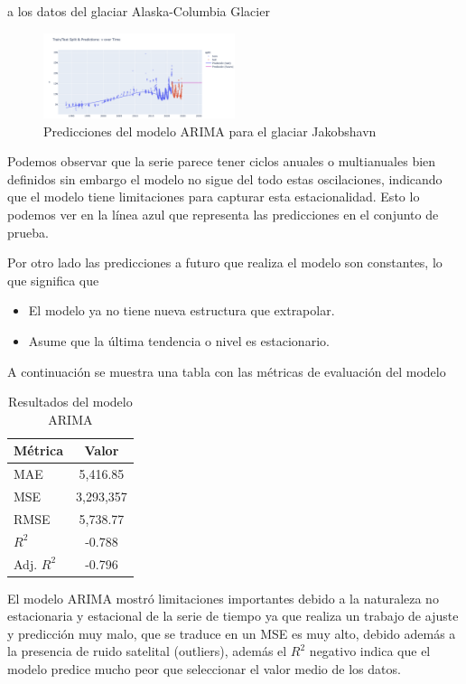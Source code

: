 \documentclass[sigconf,language=spanish]{acmart}
\begin{document}
a los datos del glaciar Alaska-Columbia Glacier

\begin{figure}[H]
    \centering
    \includegraphics[width=0.5\textwidth]{ARIMA1.png} %
    \caption{Predicciones del modelo ARIMA para el glaciar Jakobshavn}
    \label{fig:ARIMA1}
\end{figure}

Podemos observar que la serie parece tener ciclos anuales o multianuales bien definidos sin embargo el modelo
no sigue del todo estas oscilaciones, indicando que el modelo tiene limitaciones para capturar esta estacionalidad. 
Esto lo podemos ver en la línea azul que representa las predicciones en el conjunto de prueba.

Por otro lado las predicciones a futuro que realiza el modelo son constantes, lo que significa que 

\begin{itemize}
  \item El modelo ya no tiene nueva estructura que extrapolar.
  \item Asume que la última tendencia o nivel es estacionario.
\end{itemize}

A continuación se muestra una tabla con las métricas de evaluación del modelo

\begin{table}[H]
  \caption{Resultados del modelo ARIMA}
  \label{tab:ARIMA}
  \begin{tabular}{lc}
    \toprule
    Métrica & Valor \\
    \midrule
    MAE & 5,416.85 \\
    MSE & 3,293,357 \\
    RMSE & 5,738.77 \\
    $R^2$ & -0.788 \\
    Adj. $R^2$ & -0.796 \\
    \bottomrule
  \end{tabular}
\end{table}

El modelo ARIMA mostró limitaciones importantes debido a la naturaleza no estacionaria y estacional de la serie de tiempo
ya que realiza un trabajo de ajuste y predicción muy malo, que se traduce en un MSE es muy alto, debido además a la presencia de ruido satelital (outliers),
además el $R^{2}$ negativo indica que  el modelo predice mucho peor que seleccionar el valor medio de los datos.
\end{document}

